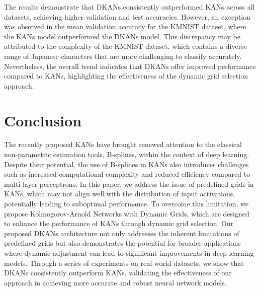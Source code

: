 \documentclass[11pt]{scrartcl}
\begin{document}
The results demonstrate that DKANs consistently outperformed KANs across all datasets, achieving higher validation and test accuracies. However, an exception was observed in the mean validation accuracy for the KMNIST dataset, where the KANs model outperformed the DKANs model. This discrepancy may be attributed to the complexity of the KMNIST dataset, which contains a diverse range of Japanese characters that are more challenging to classify accurately. Nevertheless, the overall trend indicates that DKANs offer improved performance compared to KANs, highlighting the effectiveness of the dynamic grid selection approach.

\section{Conclusion}

The recently proposed KANs have brought renewed attention to the classical non-parametric estimation tools, B-splines, within the context of deep learning. Despite their potential, the use of B-splines in KANs also introduces challenges such as increased computational complexity and reduced efficiency compared to multi-layer perceptrons.
In this paper, we address the issue of predefined grids in KANs, which may not align well with the distribution of input activations, potentially leading to suboptimal performance. To overcome this limitation, we propose Kolmogorov-Arnold Networks with Dynamic Grids, which are designed to enhance the performance of KANs through dynamic grid selection.
Our proposed DKANs architecture not only addresses the inherent limitations of predefined grids but also demonstrates the potential for broader applications where dynamic adjustment can lead to significant improvements in deep learning models. Through a series of experiments on real-world datasets, we show that DKANs consistently outperform KANs, validating the effectiveness of our approach in achieving more accurate and robust neural network models.



\end{document}
